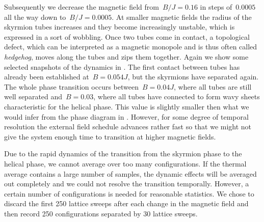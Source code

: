 Subsequently we decrease the magnetic field from~$B/J=0.16$ in steps of~$0.0005$
all the way down to~$B/J=0.0005$. At smaller magnetic fields the radius of the
skyrmion tubes increases and they become increasingly unstable, which is
expressed in a sort of wobbling. Once two tubes come in
contact, a topological defect, which can be interpreted as a magnetic monopole
and is thus often called \emph{hedgehog}, moves along the tubes and zips them
together. Again we show some selected snapshots of the dynamics in
. The first contact between tubes has already been
established at~$B=0.054 J$, but the skyrmions have separated again. The whole
phase transition occurs between~$B= 0.04 J$, where all tubes are still well
separated and~$B= 0.03$, where all tubes have connected to form wavy sheets
characteristic for the helical phase. This value is slightly smaller then what
we would infer from the phase diagram in . However, for some
degree of temporal resolution the external field schedule advances rather fast
so that we might not give the system enough time to transition at higher
magnetic fields.

Due to the rapid dynamics of the transition from the skyrmion phase to the
helical phase, we cannot average over too many configurations. If the thermal
average contains a large number of samples, the dynamic effects will be averaged
out completely and we could not resolve the transition temporally. However, a
certain number of configurations is needed for reasonable statistics. We chose
to discard the first 250 lattice sweeps after each change in the magnetic field
and then record 250 configurations separated by 30 lattice sweeps.

